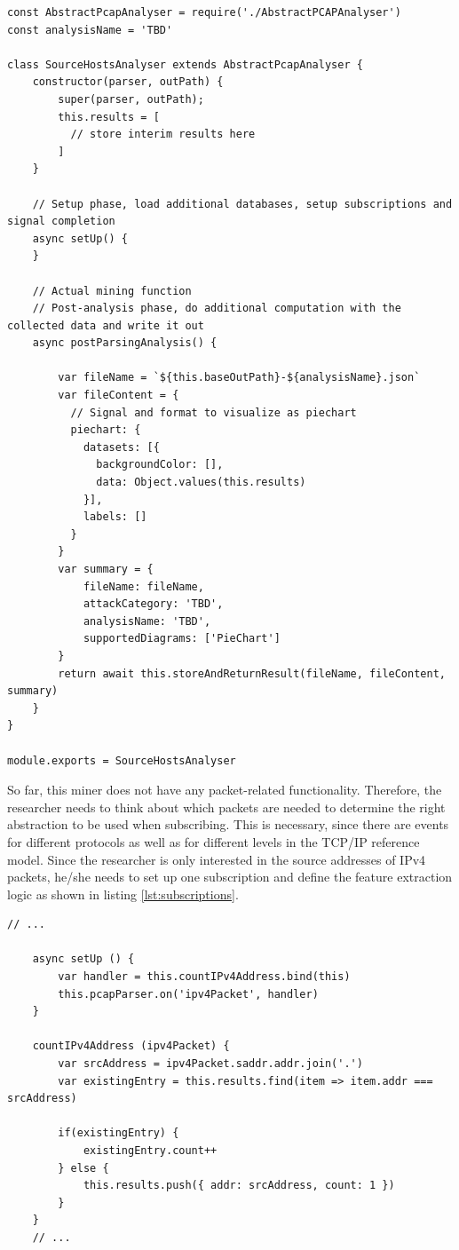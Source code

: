 \begin{lstlisting}[caption={Initial content of the newly create Miner},label={lst:initialtemplate}]
const AbstractPcapAnalyser = require('./AbstractPCAPAnalyser')
const analysisName = 'TBD'

class SourceHostsAnalyser extends AbstractPcapAnalyser {
    constructor(parser, outPath) {
        super(parser, outPath);
        this.results = [
          // store interim results here
        ]
    }

    // Setup phase, load additional databases, setup subscriptions and signal completion
    async setUp() {
    }

    // Actual mining function
    // Post-analysis phase, do additional computation with the collected data and write it out
    async postParsingAnalysis() {

        var fileName = `${this.baseOutPath}-${analysisName}.json`
        var fileContent = {
          // Signal and format to visualize as piechart
          piechart: {
            datasets: [{
              backgroundColor: [],
              data: Object.values(this.results)
            }],
            labels: []
          }
        }
        var summary = {
            fileName: fileName,
            attackCategory: 'TBD',
            analysisName: 'TBD',
            supportedDiagrams: ['PieChart']
        }
        return await this.storeAndReturnResult(fileName, fileContent, summary)
    }
}

module.exports = SourceHostsAnalyser

\end{lstlisting}

So far, this miner does not have any packet-related functionality. Therefore, the researcher needs to think about which packets are needed to determine the right abstraction to be used when subscribing. This is necessary, since there are events for different protocols as well as for different levels in the TCP/IP reference model. Since the researcher is only interested in the source addresses of IPv4 packets, he/she needs to set up one subscription and define the feature extraction logic as shown in listing \ref{lst:subscriptions}.

\begin{lstlisting}[caption={Creating a subscription and mining source addresses},label={lst:subscriptions}]
    // ...
    
    async setUp () {
        var handler = this.countIPv4Address.bind(this)
        this.pcapParser.on('ipv4Packet', handler)
    }

    countIPv4Address (ipv4Packet) {
        var srcAddress = ipv4Packet.saddr.addr.join('.')
        var existingEntry = this.results.find(item => item.addr === srcAddress)

        if(existingEntry) {
            existingEntry.count++
        } else {
            this.results.push({ addr: srcAddress, count: 1 })
        }
    }
    // ...
 

\end{lstlisting}

